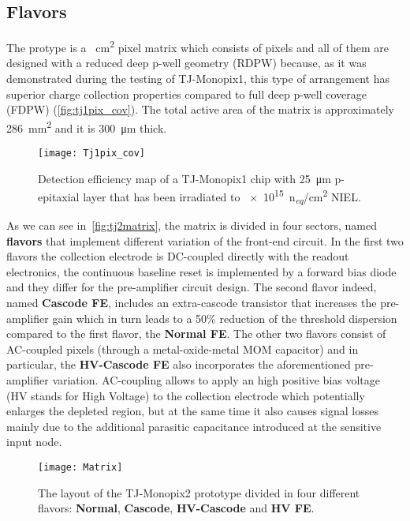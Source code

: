 \subsection{Flavors} \label{sec:flavors}

The protype is a ~\unit{cm^{2}} pixel matrix which consists of  pixels and all of them are designed with a reduced deep p-well geometry (RDPW) because, as it was demonstrated during the testing of TJ-Monopix1, this type of arrangement has superior charge collection properties compared to full deep p-well coverage (FDPW) (\autoref{fig:tj1pix_cov}). The total active area of the matrix is approximately \SI{286}{mm^{2}} and it is \SI{300}{\micro m} thick.


\begin{figure}[h!]
\centering
\texttt{[image: Tj1pix\_cov]}
\caption{Detection efficiency map of a TJ-Monopix1 chip with \SI{25}{\micro m} p-epitaxial layer that has been irradiated to \SI{e15}{n_{\textit{eq}}/cm^{2}} NIEL.}
\label{fig:tj1pix_cov}
\end{figure}

As we can see in~\autoref{fig:tj2matrix}, the matrix is divided in four sectors, named \textbf{flavors} that implement different variation of the front-end circuit. In the first two flavors the collection electrode is DC-coupled directly with the readout electronics,  the continuous baseline reset is implemented by a forward bias diode and they differ for the pre-amplifier circuit design. The second flavor indeed, named \textbf{Cascode FE}, includes an extra-cascode transistor that increases the pre-amplifier gain which in turn leads to a 50\% reduction of the threshold dispersion compared to the first flavor, the \textbf{Normal FE}. The other two flavors consist of AC-coupled pixels (through a metal-oxide-metal MOM capacitor) and in particular, the \textbf{HV-Cascode FE} also incorporates the aforementioned pre-amplifier variation. AC-coupling allows to apply an high positive bias voltage (HV stands for High Voltage) to the collection electrode which potentially enlarges the depleted region, but at the same time it also causes signal losses mainly due to the additional parasitic capacitance introduced at the sensitive input node.\\


\begin{figure}[h!]
\centering
\texttt{[image: Matrix]}
\caption{The layout of the TJ-Monopix2 prototype divided in four different flavors: \textbf{Normal}, \textbf{Cascode}, \textbf{HV-Cascode} and \textbf{HV FE}.}
\label{fig:tj2matrix}
\end{figure}


